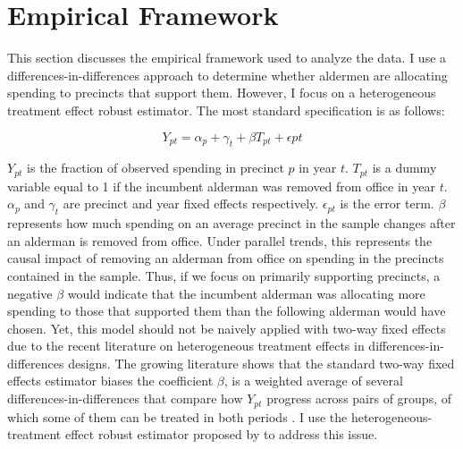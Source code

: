 \section{Empirical Framework}\label{sec:empframe}
This section discusses the empirical framework used to analyze the data.
I use a differences-in-differences approach to determine whether aldermen are allocating spending to precincts that support them.
However, I focus on a heterogeneous treatment effect robust estimator.
The most standard specification is as follows:

\begin{equation}\label{eq:standard_did}
    Y_{pt} = \alpha_{p} + \gamma_{t} + \beta T_{pt} + \epsilon{pt}
\end{equation}

$Y_{pt}$ is the fraction of observed spending in precinct $p$ in year $t$. $T_{pt}$ is a dummy variable equal to 1 if the incumbent alderman was removed from office in year $t$. $\alpha_{p}$ and $\gamma_{t}$ are precinct and year fixed effects respectively. $\epsilon_{pt}$ is the error term.
$\beta$ represents how much spending on an average precinct in the sample changes after an alderman is removed from office.
Under parallel trends, this represents the causal impact of removing an alderman from office on spending in the precincts contained in the sample.
Thus, if we focus on primarily supporting precincts, a negative $\beta$ would indicate that the incumbent alderman was allocating more spending to those that supported them than the following alderman would have chosen.
Yet, this model should not be naively applied with two-way fixed effects due to the recent literature on heterogeneous treatment effects in differences-in-differences designs.
The growing literature shows that the standard two-way fixed effects estimator biases the coefficient $\beta$, is a weighted average of several differences-in-differences that compare how $Y_{pt}$ progress across pairs of groups, of which some of them can be treated in both periods \cite{chaisetwfe} \cite{CALLAWAY2021200}. 
I use the heterogeneous-treatment effect robust estimator proposed by \cite{CALLAWAY2021200} to address this issue.

